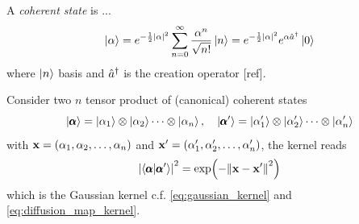 \begin{definition}\label{def:coherent_state}
	A \emph{coherent state} is ...
	\begin{equation}
		\ket{\alpha} 
		= e^{-\frac{1}{2}\abs{\alpha}^2} \sum_{n=0}^{\infty} \frac{\alpha^n}{\sqrt{n!}} \ket{n} 
		= e^{-\frac{1}{2}\abs{\alpha}^2} e^{\alpha\hat{a}^\dagger}\ket{0} 
	\end{equation}
	where $\ket{n}$ basis and $\hat{a}^\dagger$ is the creation operator [ref].
\end{definition}
Consider two $n$ tensor product of (canonical) coherent states
\begin{equation}
	\ket{\pmb{\alpha}} = \ket{\alpha_{1}} \otimes\ket{\alpha_{2}} \cdots\otimes\ket{\alpha_{n}} 
	,\quad
	\ket{\pmb{\alpha}'} = \ket{\alpha_{1}'} \otimes\ket{\alpha_{2}'} \cdots\otimes\ket{\alpha_{n}'} 
\end{equation}
with $\vb{x}=(\alpha_1,\alpha_2,\dots,\alpha_n)$ and $\vb{x}'=(\alpha_1',\alpha_2',\dots,\alpha_n')$, the kernel reads 
\cite{chatterjeeGeneralizedCoherentStates2017}
\begin{equation}
	\abs{\braket{\pmb{\alpha}}{\pmb{\alpha}'}}^2 = 
	\exp(-\norm{\vb{x}-\vb{x}'}^2) 
\end{equation}
which is the Gaussian kernel c.f. \cref{eq:gaussian_kernel} and \cref{eq:diffusion_map_kernel}.



